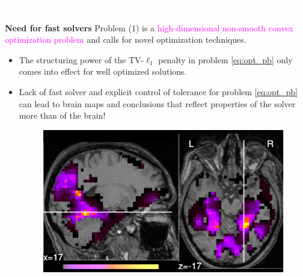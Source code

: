 \documentclass[french]{STIC_poster}
\begin{document}
\begin{frame}[t]
\begin{columns}[t]
\begin{column}{.48\linewidth}
\begin{abox}{\textbf{\textcolor{white}{Problem statement}}}
				\begin{nbox}[\textwidth]{\textbf{Need for fast solvers}}
                                  Problem (1) is a \textcolor{magenta}{high-dimensional non-smooth convex optimization problem} and calls for novel optimization techniques. %
                                  \begin{itemize}
                                    \item The structuring power of the TV-$\ell_1$ penalty in problem \eqref{eq:opt_pb} only comes into effect for well optimized solutions.
                                  \item Lack of fast solver and explicit control of
                                    tolerance for problem \eqref{eq:opt_pb} can lead to brain maps and conclusions that reflect
                                    properties of the solver more than of the brain!
                                  \begin{figure}
                                    \includegraphics[width=.32\linewidth]{maps/face_vs_house_tol_0_1.pdf}%
                                    \llap{\color{green}\raisebox{.161\linewidth}{\rlap{\sffamily %
}}}
\end{figure}
\end{itemize}
\end{nbox}
\end{abox}
\end{column}
\end{columns}
\end{frame}
\end{document}
